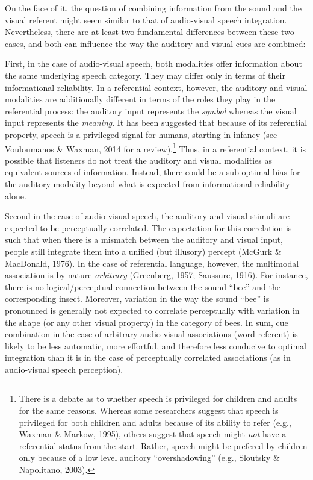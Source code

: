 \documentclass[english,floatsintext,man]{apa6}
\theoremstyle{definition}
\theoremstyle{definition}
\theoremstyle{definition}
\theoremstyle{remark}
\begin{document}
On the face of it, the question of combining information from the sound
and the visual referent might seem similar to that of audio-visual
speech integration. Nevertheless, there are at least two fundamental
differences between these two cases, and both can influence the way the
auditory and visual cues are combined:

\noindent First, in the case of audio-visual speech, both modalities
offer information about the same underlying speech category. They may
differ only in terms of their informational reliability. In a
referential context, however, the auditory and visual modalities are
additionally different in terms of the roles they play in the
referential process: the auditory input represents the \emph{symbol}
whereas the visual input represents the \emph{meaning}. It has been
suggested that because of its referential property, speech is a
privileged signal for humans, starting in infancy (see Vouloumanos \&
Waxman, 2014 for a review).\footnote{There is a debate as to whether
  speech is privileged for children and adults for the same reasons.
  Whereas some researchers suggest that speech is privileged for both
  children and adults because of its ability to refer (e.g., Waxman \&
  Markow, 1995), others suggest that speech might \emph{not} have a
  referential status from the start. Rather, speech might be prefered by
  children only because of a low level auditory ``overshadowing'' (e.g.,
  Sloutsky \& Napolitano, 2003).} Thus, in a referential context, it is
possible that listeners do not treat the auditory and visual modalities
as equivalent sources of information. Instead, there could be a
sub-optimal bias for the auditory modality beyond what is expected from
informational reliability alone.

\noindent Second in the case of audio-visual speech, the auditory and
visual stimuli are expected to be perceptually correlated. The
expectation for this correlation is such that when there is a mismatch
between the auditory and visual input, people still integrate them into
a unified (but illusory) percept (McGurk \& MacDonald, 1976). In the
case of referential language, however, the multimodal association is by
nature \emph{arbitrary} (Greenberg, 1957; Saussure, 1916). For instance,
there is no logical/perceptual connection between the sound
\enquote{bee} and the corresponding insect. Moreover, variation in the
way the sound \enquote{bee} is pronounced is generally not expected to
correlate perceptually with variation in the shape (or any other visual
property) in the category of bees. In sum, cue combination in the case
of arbitrary audio-visual associations (word-referent) is likely to be
less automatic, more effortful, and therefore less conducive to optimal
integration than it is in the case of perceptually correlated
associations (as in audio-visual speech perception).
\end{document}
